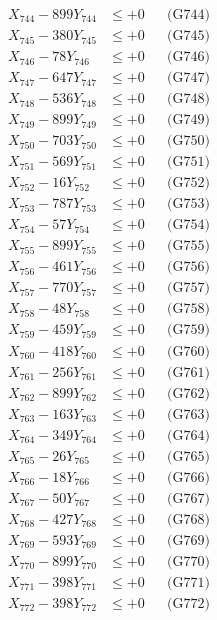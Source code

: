 \documentclass[a4paper,10pt]{article}
\begin{document}
{\begin{align}
X_{744} - 899Y_{744} &\leq +0 && \text{(G744)} \\
X_{745} - 380Y_{745} &\leq +0 && \text{(G745)} \\
X_{746} - 78Y_{746} &\leq +0 && \text{(G746)} \\
X_{747} - 647Y_{747} &\leq +0 && \text{(G747)} \\
X_{748} - 536Y_{748} &\leq +0 && \text{(G748)} \\
X_{749} - 899Y_{749} &\leq +0 && \text{(G749)} \\
X_{750} - 703Y_{750} &\leq +0 && \text{(G750)} \\
\allowbreak
X_{751} - 569Y_{751} &\leq +0 && \text{(G751)} \\
X_{752} - 16Y_{752} &\leq +0 && \text{(G752)} \\
X_{753} - 787Y_{753} &\leq +0 && \text{(G753)} \\
X_{754} - 57Y_{754} &\leq +0 && \text{(G754)} \\
X_{755} - 899Y_{755} &\leq +0 && \text{(G755)} \\
X_{756} - 461Y_{756} &\leq +0 && \text{(G756)} \\
X_{757} - 770Y_{757} &\leq +0 && \text{(G757)} \\
X_{758} - 48Y_{758} &\leq +0 && \text{(G758)} \\
X_{759} - 459Y_{759} &\leq +0 && \text{(G759)} \\
X_{760} - 418Y_{760} &\leq +0 && \text{(G760)} \\
\allowbreak
X_{761} - 256Y_{761} &\leq +0 && \text{(G761)} \\
X_{762} - 899Y_{762} &\leq +0 && \text{(G762)} \\
X_{763} - 163Y_{763} &\leq +0 && \text{(G763)} \\
X_{764} - 349Y_{764} &\leq +0 && \text{(G764)} \\
X_{765} - 26Y_{765} &\leq +0 && \text{(G765)} \\
X_{766} - 18Y_{766} &\leq +0 && \text{(G766)} \\
X_{767} - 50Y_{767} &\leq +0 && \text{(G767)} \\
X_{768} - 427Y_{768} &\leq +0 && \text{(G768)} \\
X_{769} - 593Y_{769} &\leq +0 && \text{(G769)} \\
X_{770} - 899Y_{770} &\leq +0 && \text{(G770)} \\
\allowbreak
X_{771} - 398Y_{771} &\leq +0 && \text{(G771)} \\
X_{772} - 398Y_{772} &\leq +0 && \text{(G772)} \\

\end{align}}
\end{document}
